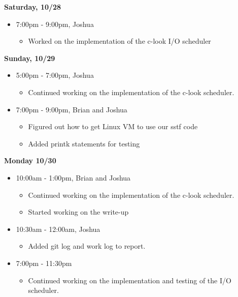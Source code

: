 \documentclass[letterpaper, onecolumn, draftclsnofoot, 10pt, compsoc]{IEEEtran}
\begin{document}
\begin{singlespace}
\begin{itemize}
            \end{itemize}
        \textbf{Saturday, 10/28}
            \begin{itemize}
                \item 7:00pm - 9:00pm, Joshua
                \begin{itemize}
                    \item Worked on the implementation of the c-look I/O scheduler
                \end{itemize}
            \end{itemize}
        \textbf{Sunday, 10/29}
            \begin{itemize}
                \item 5:00pm - 7:00pm, Joshua
                \begin{itemize}
                    \item Continued working on the implementation of the c-look scheduler.
                \end{itemize}
                \item 7:00pm - 9:00pm, Brian and Joshua
                    \begin{itemize}
                        \item Figured out how to get Linux VM to use our sstf code
                        \item Added printk statements for testing
                    \end{itemize}
            \end{itemize}
        \textbf{Monday 10/30}
            \begin{itemize}
                \item 10:00am - 1:00pm, Brian and Joshua
                \begin{itemize}
                    \item Continued working on the implementation of the c-look scheduler.
                    \item Started working on the write-up
                \end{itemize}
                \item 10:30am - 12:00am, Joshua
                    \begin{itemize}
                        \item Added git log and work log to report.
                    \end{itemize}
                \item 7:00pm - 11:30pm
                    \begin{itemize}
                        \item Continued working on the implementation and testing of the I/O scheduler.
                    \end{itemize}
            \end{itemize}


\end{singlespace}
\end{document}
